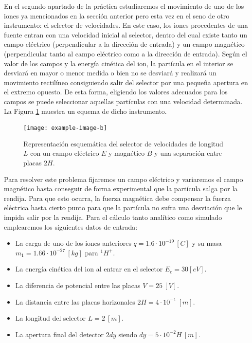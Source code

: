 \documentclass[journal]{IEEEtran}
\begin{document}
En el segundo apartado de la práctica estudiaremos el movimiento de uno de los iones ya mencionados en la sección anterior pero esta vez en el seno de otro instrumento: el selector de velocidades. En este caso, los iones procedentes de una fuente entran con una velocidad inicial al selector, dentro del cual existe tanto un campo eléctrico (perpendicular a la dirección de entrada) y un campo magnético (perpendicular tanto al campo eléctrico como a la dirección de entrada). Según el valor de los campos y la energía cinética del ion, la partícula en el interior se desviará en mayor o menor medida o bien no se desviará y realizará un movimiento rectilíneo consiguiendo salir del selector por una pequeña apertura en el extremo opuesto. De esta forma, eligiendo los valores adecuados para los campos se puede seleccionar aquellas partículas con una velocidad determinada. La Figura \ref{fig:selector} muestra un equema de dicho instrumento.

\begin{figure}[!htb]
    \texttt{[image: example-image-b]}
    \caption{Representación esquemática del selector de velocidades de longitud $L$ con un campo eléctrico $E$ y magnético $B$ y una separación entre placas $2H$.}
    \label{fig:selector}
\end{figure}

Para resolver este problema fijaremos un campo eléctrico y variaremos el campo magnético hasta conseguir de forma experimental que la partícula salga por la rendija. Para que esto ocurra, la fuerza magnética debe compensar la fuerza eléctrica hasta cierto punto para que la partícula no sufra una desviación que le impida salir por la rendija. Para el cálculo tanto analítico como simulado emplearemos los siguientes datos de entrada:

\begin{itemize}
    \item La carga de uno de los iones anteriores $q = 1.6\cdot10^{-19}~[C]$ y su masa $m_1 = 1.66\cdot10^{-27}~[kg]$ para $^1H^+$.
    \item La energía cinética del ion al entrar en el selector $E_c = 30 [eV]$.
    \item La diferencia de potencial entre las placas $V = 25~[V]$.
    \item La distancia entre las placas horizonales $2H = 4\cdot 10^{-1}~[m]$.
    \item La longitud del selector $L = 2~[m]$.
    \item La apertura final del detector $2dy$ siendo $dy = 5\cdot10^{-2}H~[m]$.
\end{itemize}
\end{document}
